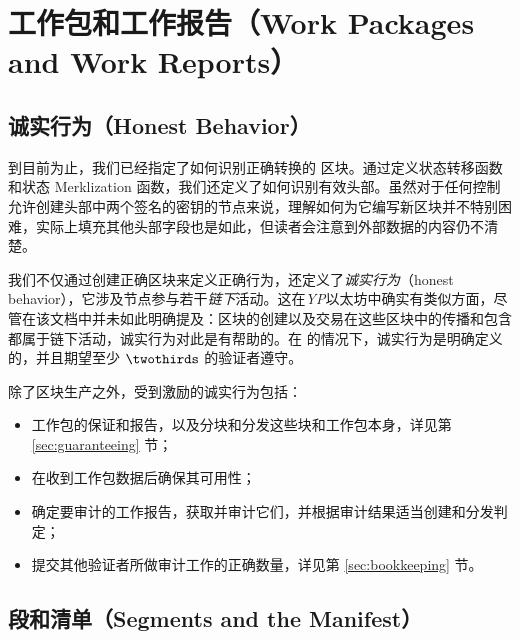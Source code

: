 \section{工作包和工作报告（Work Packages and Work Reports）}\label{sec:workpackagesandworkreports}

\newcommand*{\newavailabilityspecifier}{A}
\newcommand*{\itemtodigest}{C}
\newcommand*{\countupexports}{I}
\newcommand*{\importsegmentdata}{S}
\newcommand*{\justifysegmentdata}{J}
\newcommand*{\segrootlookup}{L}
\newcommand*{\pagedproofs}{P}
\newcommand*{\marshallrefine}{R}
\newcommand*{\extrinsicdata}{X}
\newcommand*{\segsX}{\mathbf{b}}
\newcommand*{\allexports}{\overline{\mathbf{e}}}

\subsection{诚实行为（Honest Behavior）}

到目前为止，我们已经指定了如何识别正确转换的 \Jam 区块。通过定义状态转移函数和状态 Merklization 函数，我们还定义了如何识别有效头部。虽然对于任何控制允许创建头部中两个签名的密钥的节点来说，理解如何为它编写新区块并不特别困难，实际上填充其他头部字段也是如此，但读者会注意到外部数据的内容仍不清楚。

我们不仅通过创建正确区块来定义正确行为，还定义了\emph{诚实行为}（honest behavior），它涉及节点参与若干\emph{链下}活动。这在\emph{YP}以太坊中确实有类似方面，尽管在该文档中并未如此明确提及：区块的创建以及交易在这些区块中的传播和包含都属于链下活动，诚实行为对此是有帮助的。在 \Jam 的情况下，诚实行为是明确定义的，并且期望至少 $\twothirds$ 的验证者遵守。

除了区块生产之外，受到激励的诚实行为包括：
\begin{itemize}
    \item 工作包的保证和报告，以及分块和分发这些块和工作包本身，详见第 \ref{sec:guaranteeing} 节；
    \item 在收到工作包数据后确保其可用性；
    \item 确定要审计的工作报告，获取并审计它们，并根据审计结果适当创建和分发判定；
    \item 提交其他验证者所做审计工作的正确数量，详见第 \ref{sec:bookkeeping} 节。
\end{itemize}

\subsection{段和清单（Segments and the Manifest）}

